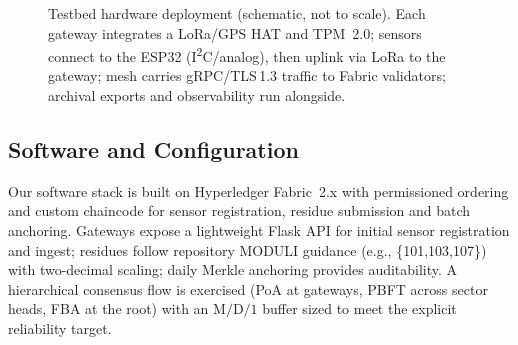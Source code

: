\documentclass[12pt,onecolumn]{IEEEtran} %
\begin{document}
\begin{figure}[!t]
{%
  }
  \caption{Testbed hardware deployment (schematic, not to scale). Each gateway integrates a LoRa/GPS HAT and TPM~2.0; sensors connect to the ESP32 (I\textsuperscript{2}C/analog), then uplink via LoRa to the gateway; mesh carries gRPC/TLS\,1.3 traffic to Fabric validators; archival exports and observability run alongside.}
  \label{fig:hardware-deployment}
\end{figure}


\subsection{Software and Configuration}
\label{subsec:software-config}
Our software stack is built on Hyperledger Fabric~2.x with permissioned ordering and custom chaincode for sensor registration, residue submission and batch anchoring. Gateways expose a lightweight Flask API for initial sensor registration and ingest; residues follow repository MODULI guidance (e.g., \{101,103,107\}) with two-decimal scaling; daily Merkle anchoring provides auditability. A hierarchical consensus flow is exercised (PoA at gateways, PBFT across sector heads, FBA at the root) with an $\mathrm{M}/\mathrm{D}/1$ buffer sized to meet the explicit reliability target.
\end{document}
